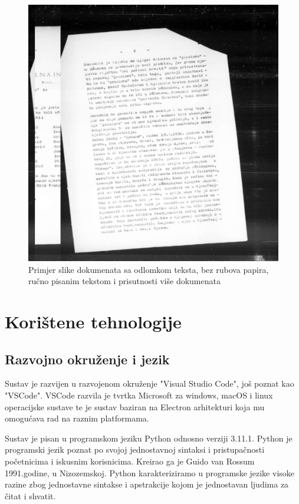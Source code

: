 \documentclass[times, utf8, zavrsni, numeric]{fer}
\begin{document}
\begin{figure}[H]
        \centering
	\includegraphics[scale=0.96]{images/opis/Z05353549.jpg}
	\caption{Primjer slike dokumenata sa odlomkom teksta, bez rubova papira, ručno pisanim tekstom i prisutnosti više dokumenata}
	\label{fig:binary_example}
\end{figure}



\pagebreak
\chapter{Korištene tehnologije}
\section{Razvojno okruženje i jezik}
Sustav je razvijen u razvojenom okruženje "Visual Studio Code", još poznat kao "VSCode". VSCode razvila je tvrtka Microsoft za windows, macOS i linux operacijske sustave te je sustav baziran na Electron arhitekturi koja mu omogućava rad na raznim platformama.

Sustav je pisan u programskom jeziku Python odnosno verziji 3.11.1.
Python je programski jezik poznat po svojoj jednostavnoj sintaksi i pristupačnosti početnicima i iskusnim korisnicima. Kreirao ga je Guido van Rossum 1991.godine, u Nizozemskoj. Python karakteriziramo u programske jezike visoke razine zbog jednostavne sintakse i apstrakcije kojom je jednostavan ljudima za čitat i shvatit.
\end{document}
